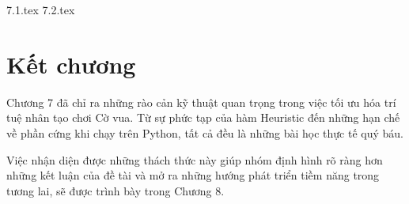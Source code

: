 {7.1.tex}
{7.2.tex}

\section{Kết chương}
Chương 7 đã chỉ ra những rào cản kỹ thuật quan trọng trong việc tối ưu hóa trí tuệ nhân tạo chơi Cờ vua. Từ sự phức tạp của hàm Heuristic đến những hạn chế về phần cứng khi chạy trên Python, tất cả đều là những bài học thực tế quý báu. 

Việc nhận diện được những thách thức này giúp nhóm định hình rõ ràng hơn những kết luận của đề tài và mở ra những hướng phát triển tiềm năng trong tương lai, sẽ được trình bày trong Chương 8.
